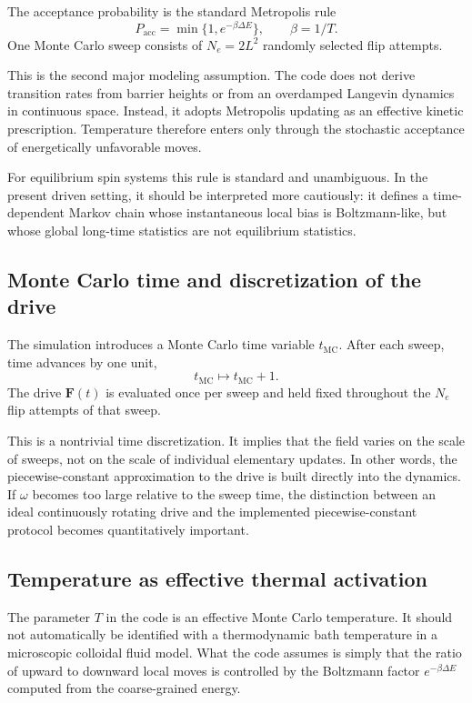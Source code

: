 \documentclass[11pt]{article}
\begin{document}
The acceptance probability is the standard Metropolis rule
\[
  P_{\mathrm{acc}} = \min\{1,e^{-\beta \Delta E}\},
  \qquad \beta = 1/T.
\]
One Monte Carlo sweep consists of $N_e=2L^2$ randomly selected flip attempts.

This is the second major modeling assumption. The code does not derive
transition rates from barrier heights or from an overdamped Langevin dynamics in
continuous space. Instead, it adopts Metropolis updating as an effective kinetic
prescription. Temperature therefore enters only through the stochastic
acceptance of energetically unfavorable moves.

For equilibrium spin systems this rule is standard and unambiguous. In the
present driven setting, it should be interpreted more cautiously: it defines a
time-dependent Markov chain whose instantaneous local bias is Boltzmann-like, but
whose global long-time statistics are not equilibrium statistics.

\subsection{Monte Carlo time and discretization of the drive}

The simulation introduces a Monte Carlo time variable $t_{\mathrm{MC}}$. After
each sweep, time advances by one unit,
\[
  t_{\mathrm{MC}} \mapsto t_{\mathrm{MC}}+1.
\]
The drive $\mathbf{F}(t)$ is evaluated once per sweep and held fixed throughout
the $N_e$ flip attempts of that sweep.

This is a nontrivial time discretization. It implies that the field varies on
the scale of sweeps, not on the scale of individual elementary updates. In other
words, the piecewise-constant approximation to the drive is built directly into
the dynamics. If $\omega$ becomes too large relative to the sweep time, the
distinction between an ideal continuously rotating drive and the implemented
piecewise-constant protocol becomes quantitatively important.

\subsection{Temperature as effective thermal activation}

The parameter $T$ in the code is an effective Monte Carlo temperature. It should
not automatically be identified with a thermodynamic bath temperature in a
microscopic colloidal fluid model. What the code assumes is simply that the
ratio of upward to downward local moves is controlled by the Boltzmann factor
$e^{-\beta \Delta E}$ computed from the coarse-grained energy.
\end{document}
